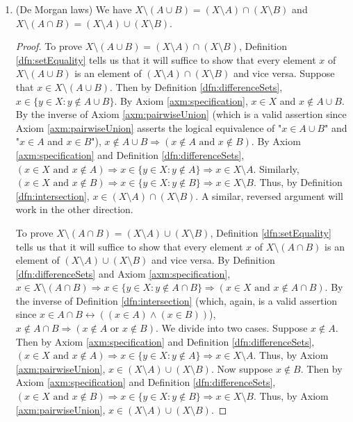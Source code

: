 \documentclass[../main.tex]{subfiles}
\begin{document}
\begin{enumerate}[ref={\thesection.\arabic*}]
\begin{prp}
\begin{enumerate}[label={\textup{(}\alph*\textup{)}},ref={\theenumi\alph*}]
\begin{proof}
            \end{proof}
            \item \label{exr:3.1.6h}(De Morgan laws) We have $X\setminus(A\cup B)=(X\setminus A)\cap(X\setminus B)$ and $X\setminus(A\cap B)=(X\setminus A)\cup(X\setminus B)$.
            \begin{proof}
                To prove $X\setminus(A\cup B)=(X\setminus A)\cap(X\setminus B)$, Definition \ref{dfn:setEquality} tells us that it will suffice to show that every element $x$ of $X\setminus(A\cup B)$ is an element of $(X\setminus A)\cap(X\setminus B)$ and vice versa. Suppose that $x\in X\setminus(A\cup B)$. Then by Definition \ref{dfn:differenceSets}, $x\in\{y\in X:y\notin A\cup B\}$. By Axiom \ref{axm:specification}, $x\in X$ and $x\notin A\cup B$. By the inverse of Axiom \ref{axm:pairwiseUnion} (which is a valid assertion since Axiom \ref{axm:pairwiseUnion} asserts the logical equivalence of "$x\in A\cup B$" and "$x\in A$ and $x\in B$"), $x\notin A\cup B \Longrightarrow (x\notin A\text{ and }x\notin B)$. By Axiom \ref{axm:specification} and Definition \ref{dfn:differenceSets}, $(x\in X\text{ and }x\notin A) \Longrightarrow x\in\{y\in X:y\notin A\} \Longrightarrow x\in X\setminus A$. Similarly, $(x\in X\text{ and }x\notin B) \Longrightarrow x\in\{y\in X:y\notin B\} \Longrightarrow x\in X\setminus B$. Thus, by Definition \ref{dfn:intersection}, $x\in(X\setminus A)\cap(X\setminus B)$. A similar, reversed argument will work in the other direction.\par
                To prove $X\setminus(A\cap B)=(X\setminus A)\cup(X\setminus B)$, Definition \ref{dfn:setEquality} tells us that it will suffice to show that every element $x$ of $X\setminus(A\cap B)$ is an element of $(X\setminus A)\cup(X\setminus B)$ and vice versa. By Definition \ref{dfn:differenceSets} and Axiom \ref{axm:specification}, $x\in X\setminus(A\cap B) \Longrightarrow x\in\{y\in X:y\notin A\cap B\} \Longrightarrow (x\in X\text{ and }x\notin A\cap B)$. By the inverse of Definition \ref{dfn:intersection} (which, again, is a valid assertion since $x\in A\cap B \leftrightarrow ((x\in A) \wedge (x\in B))$), $x\notin A\cap B \Longrightarrow (x\notin A\text{ or }x\notin B)$. We divide into two cases. Suppose $x\notin A$. Then by Axiom \ref{axm:specification} and Definition \ref{dfn:differenceSets}, $(x\in X\text{ and }x\notin A) \Longrightarrow x\in\{y\in X:y\notin A\} \Longrightarrow x\in X\setminus A$. Thus, by Axiom \ref{axm:pairwiseUnion}, $x\in(X\setminus A)\cup(X\setminus B)$. Now suppose $x\notin B$. Then by Axiom \ref{axm:specification} and Definition \ref{dfn:differenceSets}, $(x\in X\text{ and }x\notin B) \Longrightarrow x\in\{y\in X:y\notin B\} \Longrightarrow x\in X\setminus B$. Thus, by Axiom \ref{axm:pairwiseUnion}, $x\in(X\setminus A)\cup(X\setminus B)$.

\end{proof}
\end{enumerate}
\end{prp}
\end{enumerate}
\end{document}
